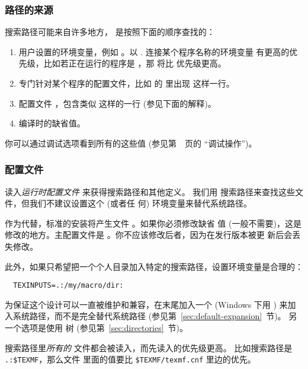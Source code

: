 \documentclass{article}
\begin{document}
\subsubsection{路径的来源}
\label{sec:path-sources}

搜索路径可能来自许多地方，\KPS{} 是按照下面的顺序查找的：

\begin{enumerate}
\item
  用户设置的环境变量，例如 \@。以 . 连接某个程序名称的环境变量
有更高的优先级，比如若正在运行的程序是 ，那 
将比  优先级更高。
\item
  专门针对某个程序的配置文件，比如  的  里出现
 这样一行。
\item   \KPS{} 配置文件 ，包含类似
   这样的一行 (参见下面的解释)。
\item 编译时的缺省值。
\end{enumerate}
\noindent 你可以通过调试选项看到所有的这些值 (参见第~\pageref{sec:debugging}~页的
``调试操作'')。

\subsubsection{配置文件}

\KPS{} 读入\emph{运行时配置文件}  来获得搜索路径和其他定义。
我们用  搜索路径来查找这些文件，但我们不建议设置这个 (或者任
何) 环境变量来替代系统路径。

作为代替，标准的安装将产生文件 。如果你必须修改缺省
值 (一般不需要)，这是修改的地方。主配置文件是
。你不应该修改后者，因为在发行版本被更
新后会丢失修改。

此外，如果只希望把一个个人目录加入特定的搜索路径，设置环境变量是合理的：
\begin{verbatim}
  TEXINPUTS=.:/my/macro/dir:
\end{verbatim}
为保证这个设计可以一直被维护和兼容，在末尾加入一个 \samp{:} (Windows 下用 \samp{;})
来加入系统路径，而不是完全替代系统路径 (参见第~\ref{sec:default-expansion}~节)。
另一个选项是使用  树 (参见第~\ref{sec:directories}~节)。

搜索路径里\emph{所有的}  文件都会被读入，而先读入的优先级更高。
比如搜索路径是 \verb|.:$TEXMF|，那么文件  里面的值要比
\verb|$TEXMF/texmf.cnf| 里边的优先。
\end{document}
